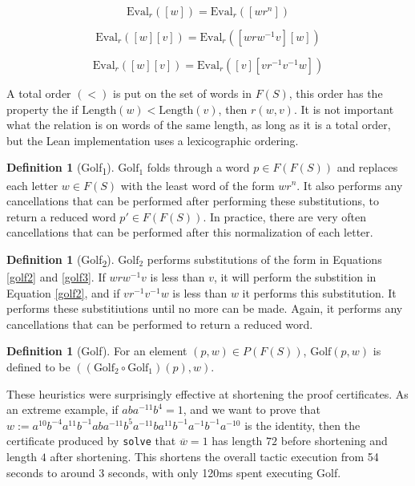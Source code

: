 \documentclass[12pt]{article} %
\theoremstyle{definition}
\theoremstyle{definition}
\theoremstyle{definition}
\theoremstyle{definition}
\newtheorem{defn}[thm]{Definition}
\begin{document}
\begin{equation}\label{golf1}
  \text{Eval}_r([w]) = \text{Eval}_r([wr^n])
\end{equation}

\begin{equation}\label{golf2}
  \text{Eval}_r([w][v]) = \text{Eval}_r([wrw^{-1}v][w])
\end{equation}

\begin{equation}\label{golf3}
  \text{Eval}_r([w][v]) = \text{Eval}_r([v][vr^{-1}v^{-1}w])
\end{equation}

A total order $(<)$ is put on the set of words in $F(S)$, this order has
the property the if $\text{Length}(w) < \text{Length}(v)$, then
$r(w,v)$. It is not important what the relation is on words of the same length,
as long as it is a total order, but the Lean implementation uses a lexicographic ordering.

\begin{defn}[Golf\textsubscript{1}]
$\text{Golf}_1$ folds through a word $p \in F(F(S))$ and replaces each
letter $w \in F(S)$ with the least word of the form $wr^n$.
It also performs any cancellations that can be performed after
performing these substitutions, to return a reduced word $p' \in F(F(S))$.
In practice, there are very often cancellations
that can be performed after this normalization of each letter.
\end{defn}

\begin{defn}[Golf\textsubscript{2}]
  $\text{Golf}_2$ performs substitutions of the form in Equations \ref{golf2} and
  \ref{golf3}. If $wrw^{-1}v$ is less than $v$, it will perform the substition
  in Equation \ref{golf2}, and if $vr^{-1}v^{-1}w$ is less than $w$ it performs
  this substitution. It performs these substitiutions until no more can be made.
  Again, it performs any cancellations that can be performed to return
  a reduced word.
\end{defn}

\begin{defn}[Golf]
  For an element $(p, w) \in P(F(S))$, $\text{Golf}(p, w)$ is defined to be
  $((\text{Golf}_2 \circ \text{Golf}_1)(p), w)$.
\end{defn}

These heuristics were surprisingly effective at shortening the proof certificates.
As an extreme example, if $aba^{-11}b^4 =1$, and
we want to prove that $w := a^{10}b^{-4}a^{11}b^{-1}ab a^{-11} b^5a^{-11}b a^{11}b^{-1}a^{-1}b^{-1}a^{-10}$
is the identity,
then the certificate produced by \lstinline{solve} that $\overline{w} =1$
 has length $72$ before shortening and length $4$ after shortening.
 This shortens the overall tactic execution from 54 seconds to around
 3 seconds, with only 120ms spent executing Golf.
\end{document}
